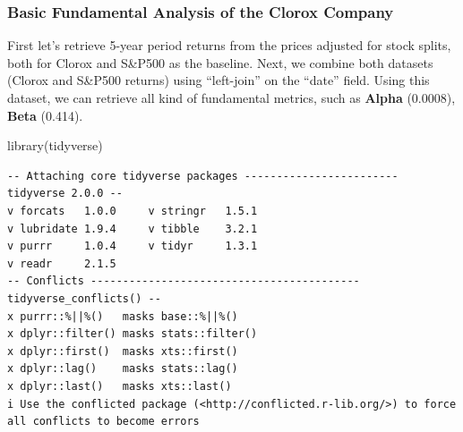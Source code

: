 \documentclass[
  letterpaper,
  DIV=11,
  numbers=noendperiod]{scrartcl}
\newenvironment{Shaded}{\begin{snugshade}}{\end{snugshade}}
\newcommand{\FunctionTok}[1]{\textcolor[rgb]{0.28,0.35,0.67}{#1}}
\newcommand{\NormalTok}[1]{\textcolor[rgb]{0.00,0.23,0.31}{#1}}
\begin{document}
\subsubsection{\texorpdfstring{\textbf{Basic Fundamental Analysis of the
Clorox
Company}}{Basic Fundamental Analysis of the Clorox Company}}\label{basic-fundamental-analysis-of-the-clorox-company}

First let's retrieve 5-year period returns from the prices adjusted for
stock splits, both for Clorox and S\&P500 as the baseline. Next, we
combine both datasets (Clorox and S\&P500 returns) using ``left-join''
on the ``date'' field. Using this dataset, we can retrieve all kind of
fundamental metrics, such as \textbf{Alpha} (0.0008), \textbf{Beta}
(0.414).

\begin{Shaded}
\begin{Highlighting}[]
\FunctionTok{library}\NormalTok{(tidyverse)}
\end{Highlighting}
\end{Shaded}

\begin{verbatim}
-- Attaching core tidyverse packages ------------------------ tidyverse 2.0.0 --
v forcats   1.0.0     v stringr   1.5.1
v lubridate 1.9.4     v tibble    3.2.1
v purrr     1.0.4     v tidyr     1.3.1
v readr     2.1.5     
-- Conflicts ------------------------------------------ tidyverse_conflicts() --
x purrr::%||%()   masks base::%||%()
x dplyr::filter() masks stats::filter()
x dplyr::first()  masks xts::first()
x dplyr::lag()    masks stats::lag()
x dplyr::last()   masks xts::last()
i Use the conflicted package (<http://conflicted.r-lib.org/>) to force all conflicts to become errors
\end{verbatim}
\end{document}
